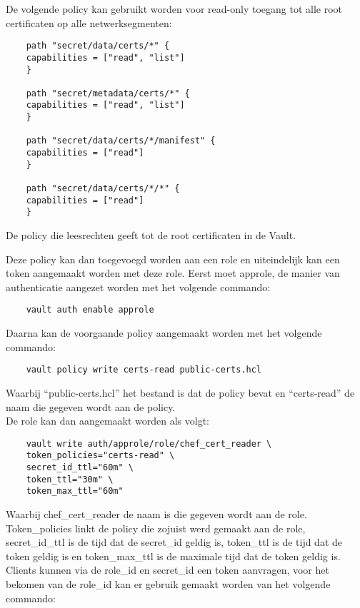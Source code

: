 De volgende policy kan gebruikt worden voor read-only toegang tot alle root certificaten op alle netwerksegmenten:
\begin{listing}[H]
\begin{verbatim}     
    path "secret/data/certs/*" {
    capabilities = ["read", "list"]
    }

    path "secret/metadata/certs/*" {
    capabilities = ["read", "list"]
    }

    path "secret/data/certs/*/manifest" {
    capabilities = ["read"]
    }

    path "secret/data/certs/*/*" {
    capabilities = ["read"]
    }
\end{verbatim}
\caption[Policy met leesrechten tot de Vault]{De policy die leesrechten geeft tot de root certificaten in de Vault.}
\end{listing}

Deze policy kan dan toegevoegd worden aan een role en uiteindelijk kan een token aangemaakt worden met deze role.
Eerst moet approle, de manier van authenticatie aangezet worden met het volgende commando:

\begin{verbatim}
    vault auth enable approle
\end{verbatim}

Daarna kan de voorgaande policy aangemaakt worden met het volgende commando:

\begin{verbatim}
    vault policy write certs-read public-certs.hcl
\end{verbatim}

Waarbij ``public-certs.hcl'' het bestand is dat de policy bevat en ``certs-read'' de naam die gegeven wordt aan de policy. \\

De role kan dan aangemaakt worden als volgt:
\begin{verbatim}
    vault write auth/approle/role/chef_cert_reader \
    token_policies="certs-read" \
    secret_id_ttl="60m" \
    token_ttl="30m" \
    token_max_ttl="60m"
\end{verbatim}
Waarbij chef\_cert\_reader de naam is die gegeven wordt aan de role. Token\_policies linkt de policy die zojuist werd gemaakt aan de role, secret\_id\_ttl is de tijd dat de secret\_id geldig is, token\_ttl is de tijd dat de token geldig is en token\_max\_ttl is de maximale tijd dat de token geldig is.
Clients kunnen via de role\_id en secret\_id een token aanvragen, voor het bekomen van de role\_id kan er gebruik gemaakt worden van het volgende commando:

